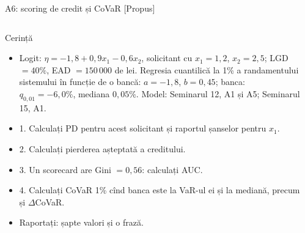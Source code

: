\begin{frame}{A6: scoring de credit și CoVaR [Propus]}
\propsub
\itemsize{\scriptsize}
\begin{columns}[T]
\begin{column}{\taskw}
\begin{block}{Cerință}
\begin{itemize}
    \item Logit: $\eta = -1{,}8 + 0{,}9x_1 - 0{,}6x_2$, solicitant cu $x_1 = 1{,}2$, $x_2 = 2{,}5$; LGD $= 40\%$, EAD $= 150\,000$ de lei. Regresia cuantilică la 1\% a randamentului sistemului în funcție de o bancă: $a = -1{,}8$, $b = 0{,}45$; banca: $q_{0,01} = -6{,}0\%$, mediana $0{,}05\%$. Model: Seminarul 12, A1 și A5; Seminarul 15, A1.
    \item 1. Calculați PD pentru acest solicitant și raportul șanselor pentru $x_1$.
    \item 2. Calculați pierderea așteptată a creditului.
    \item 3. Un scorecard are Gini $= 0{,}56$: calculați AUC.
    \item 4. Calculați CoVaR 1\% cînd banca este la VaR-ul ei și la mediană, precum și $\Delta$CoVaR.
    \item Raportați: șapte valori și o frază.
\end{itemize}
\end{block}
\end{column}
\begin{column}{\solw}
\end{column}
\end{columns}
\end{frame}


